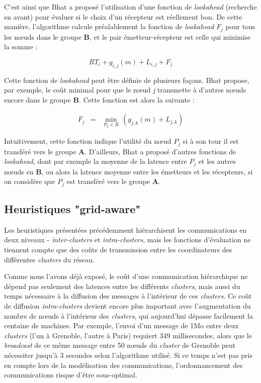 C'est ainsi que Bhat a proposé l'utilisation d'une fonction de \emph{lookahead}
(recherche en avant) pour évaluer si le choix d'un récepteur est réellement
bon. De cette manière, l'algorithme calcule préalablement la fonction
de \emph{lookahead} $F_{j}$ pour tous les n{\oe}uds dans le groupe
\textbf{B}, et le pair émetteur-récepteur est celle qui minimise
la somme :

\[
RT_{i}+g_{i,j}(m)+L_{i,j}+F_{j}\]


Cette fonction de \emph{lookahead} peut être définie de plusieurs
façons. Bhat \cite{Bhat03} propose, par exemple, le coût minimal
pour que le n{\oe}ud \emph{j} transmette à d'autres n{\oe}uds encore
dans le groupe \textbf{B}. Cette fonction est alors la suivante :

\begin{eqnarray*}
	F_{j} & = & \min_{P_{k}\in B}\,(g_{j,k}(m)+L_{j,k})\end{eqnarray*}


Intuitivement, cette fonction indique l'utilité du n{\oe}ud $P_{j}$
si à son tour il est transféré vers le groupe \textbf{A}. D'ailleurs,
Bhat a proposé d'autres fonctions de \emph{lookahead}, dont par exemple
la moyenne de la latence entre $P_{j}$ et les autres n{\oe}uds en
\textbf{B}, ou alors la latence moyenne entre les émetteurs et les
récepteurs, si on considère que $P_{j}$ est transféré vers le groupe
\textbf{A}. 


\subsection*{Heuristiques "grid-aware"}

Les heuristiques présentées précédemment hiérarchisent les communications en deux niveaux - \emph{inter-clusters}
et \emph{intra-clusters}, mais les fonctions d'évaluation ne tiennent compte que des coûts de transmission entre les coordinateurs
des différentes  \textit{clusters} du réseau.

Comme nous l'avons déjà exposé, le coût d'une communication
hiérarchique ne dépend pas seulement des latences entre les différents
 \textit{clusters}, mais aussi du temps nécessaire à la diffusion des messages
à l'intérieur de ces  \textit{clusters}. Ce coût de diffusion \textit{intra-clusters} devient
encore plus important avec l'augmentation du nombre de n{\oe}uds à l'intérieur
des  \textit{clusters}, qui aujourd'hui dépasse facilement la centaine de machines.
Par exemple, l'envoi d'un message de 1Mo entre deux \textit{clusters} (l'un à Grenoble, l'autre à Paris) requiert 349 millisecondes, alors que
le \textit{broadcast} de ce même message entre 50 n{\oe}uds du \textit{cluster} de Grenoble
peut nécessiter jusqu'à 3 secondes selon l'algorithme
utilisé. Si ce temps n'est pas pris en compte lors de la modélisation
des communications, l'ordonnancement des communications risque d'être
sous-optimal.

